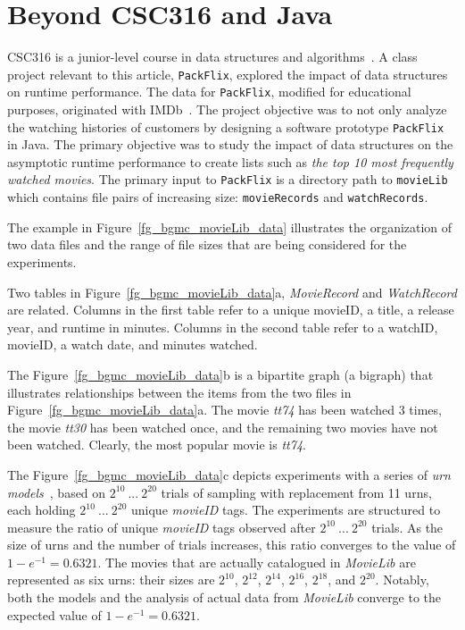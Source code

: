 

\section{Beyond CSC316 and Java} \label{sec_316}
\noindent
%
CSC316 is a junior-level course in data
structures and algorithms~\cite{OPUS-csc316-fall-2020}.
A class project relevant to this article, {\tt PackFlix}, 
explored the impact of data structures on runtime performance. 
The data for  {\tt PackFlix}, modified for educational purposes, originated with IMDb~\cite{OPUS-csc316-dataset}. 
The project objective was to not only analyze the watching histories
of customers by designing a software prototype {\tt PackFlix}
in Java. The primary objective was to study the 
impact of data structures on the 
asymptotic runtime performance to create lists
such as {\it the top 10 most frequently watched movies}.
The primary input to {\tt PackFlix} is a directory path to 
 {\tt movieLib} which contains file pairs of increasing size:
{\tt movieRecords} and {\tt watchRecords}.

The example in Figure~\ref{fg_bgmc_movieLib_data} illustrates the organization 
of two data files and the range of
file sizes that are being considered for the experiments. 
 
Two tables in Figure~\ref{fg_bgmc_movieLib_data}a,
{\it MovieRecord} and  {\it WatchRecord} are related.
Columns in the first table refer to a unique movieID, a title, a release year, and runtime in minutes.
Columns in the second  table refer to a watchID, movieID, a watch date, and minutes watched.

The Figure~\ref{fg_bgmc_movieLib_data}b is a bipartite graph (a bigraph) 
that illustrates relationships between the items from the two files 
in Figure~\ref{fg_bgmc_movieLib_data}a.
The movie {\it tt74} has been watched 3 times, the movie {\it tt30}  has been watched once, 
and the remaining two movies have not been watched. 
Clearly, the most popular movie is {\it tt74}.


The Figure~\ref{fg_bgmc_movieLib_data}c depicts experiments with a series of 
{\em urn models}~\cite{OPUS-book_stats-1977-Wiley-Johnson-urn_models}, 
based on $2^{10}~...~2^{20}$ trials of sampling with replacement   
from 11 urns, each holding $2^{10}~...~2^{20}$ unique  {\it movieID} tags.
The experiments are structured to measure the ratio of unique {\it movieID} tags observed after
$2^{10}~...~2^{20}$ trials. 
As the size of urns and the number of trials increases, this ratio converges to
the value of $1 - e^{-1} = 0.6321$.
The movies that are actually catalogued in {\it MovieLib}  are represented as six urns: their sizes are
$2^{10}$,  $2^{12}$,  $2^{14}$, $2^{16}$, $2^{18}$,  and $2^{20}$.
 Notably, both the models and the analysis of
actual data from  {\it MovieLib} converge to the expected value of $1 - e^{-1} = 0.6321$.

